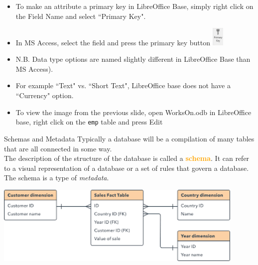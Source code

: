 \documentclass[xcolor=svgnames]{beamer}
\newcommand{\nl}{\\[1em]}
\newcommand{\define}[1]{\textbf{\textcolor{orange}{#1}}}
\theoremstyle{example}
\begin{document}
\begin{frame}
\begin{itemize}
\item To make an attribute a primary key in LibreOffice Base, simply right click on the Field Name and select ``Primary Key". 
\vfill
\item In MS Access, select the field and press the  primary key button \includegraphics[width=1.5em]{img/pkey} 
\vfill
\item N.B. Data type options are named slightly different in LibreOffice Base than MS Access).
\vfill
\item For example %
``Text" vs. ``Short Text", LibreOffice base does not have a ``Currency" option.
\vfill
\item To  view the image from the previous slide, open WorksOn.odb in LibreOffice base, right click on the {\tt emp} table and press Edit
\vfill
\end{itemize}

\end{frame}



\begin{frame}{Schemas and Metadata}
%
Typically a database will be a compilation of many tables that are all connected in some way.\nl
The description of the structure of the database is called a \define{schema}. It can refer to a visual representation of a database or a set of rules that govern a database.\nl

The schema is a type of \emph{metadata}.
\begin{center}
\includegraphics[width=0.9\textwidth]{img/schema}
\end{center}
\end{frame}
\end{document}
